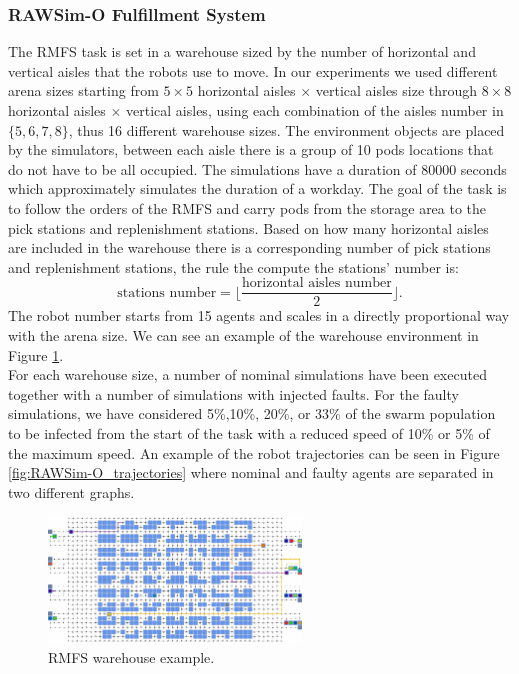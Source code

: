 \documentclass[../../Thesis.tex]{subfiles}
\begin{document}
			\subsubsection{RAWSim-O Fulfillment System}
			\label{sec:fault_detection:RAWSim-O_fulfillment_system}%
				The RMFS task is set in a warehouse sized by the number of horizontal and vertical aisles that the robots use to move. In our experiments we used different arena sizes starting from $5 \times 5$ horizontal aisles $\times$ vertical aisles size through $8 \times 8$ horizontal aisles $\times$ vertical aisles, using each combination of the aisles number in $\lbrace 5, 6, 7, 8 \rbrace$, thus 16 different warehouse sizes. The environment objects are placed by the simulators, between each aisle there is a group of 10 pods locations that do not have to be all occupied.  The simulations have a duration of 80000 seconds which approximately simulates the duration of a workday.  The goal of the task is to follow the orders of the RMFS and carry pods from the storage area to the pick stations and replenishment stations.  Based on how many horizontal aisles are included in the warehouse there is a corresponding number of pick stations and replenishment stations, the rule the compute the stations' number is:
				\[\text{stations number} = \lfloor \frac{\text{horizontal aisles number}}{2} \rfloor .\]
				The robot number starts from 15 agents and scales in a directly proportional way with the arena size.  We can see an example of the warehouse environment in Figure \ref{fig:rawsim_o_2d}. \\
				For each warehouse size, a number of nominal simulations have been executed together with a number of simulations with injected faults. For the faulty simulations, we have considered 5\%,10\%, 20\%, or 33\% of the swarm population to be infected from the start of the task with a reduced speed of 10\% or 5\% of the maximum speed.  An example of the robot trajectories can be seen in Figure \ref{fig:RAWSim-O_trajectories} where nominal and faulty agents are separated in two different graphs.
				\begin{figure}
				    \centering
				    \includegraphics[width=0.6\textwidth]{../../Images/Fault_detection/rawsim-o-2d.png}
				    \caption{RMFS warehouse example.}
				    \label{fig:rawsim_o_2d}
				\end{figure}
\end{document}
